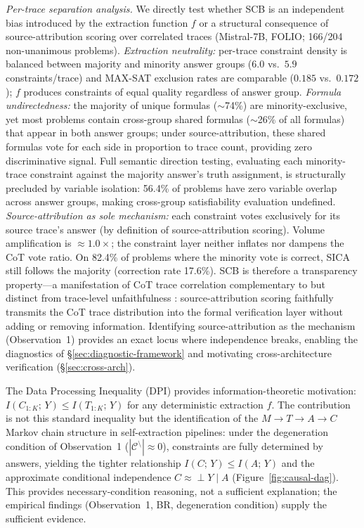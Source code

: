 \smallskip\noindent
\textit{Per-trace separation analysis.}\;%
 We directly test whether SCB is an independent bias introduced by the extraction function $f$ or a structural consequence of source-attribution scoring over correlated traces (Mistral-7B, FOLIO; 166/204 non-unanimous problems).
\emph{Extraction neutrality:} per-trace constraint density is balanced between majority and minority answer groups ($6.0$ vs.\ $5.9$ constraints/trace) and MAX-SAT exclusion rates are comparable ($0.185$ vs.\ $0.172$); $f$ produces constraints of equal quality regardless of answer group.
\emph{Formula undirectedness:} the majority of unique formulas (${\sim}$74\%) are minority-exclusive, yet most problems contain cross-group shared formulas (${\sim}$26\% of all formulas) that appear in both answer groups; under source-attribution, these shared formulas vote for each side in proportion to trace count, providing zero discriminative signal. Full semantic direction testing, evaluating each minority-trace constraint against the majority answer's truth assignment, is structurally precluded by variable isolation: 56.4\% of problems have zero variable overlap across answer groups, making cross-group satisfiability evaluation undefined.
\emph{Source-attribution as sole mechanism:} each constraint votes exclusively for its source trace's answer (by definition of source-attribution scoring). Volume amplification is ${\approx}1.0\times$; the constraint layer neither inflates nor dampens the CoT vote ratio. On 82.4\% of problems where the minority vote is correct, SICA still follows the majority (correction rate 17.6\%).
SCB is therefore a transparency property---a manifestation of CoT trace correlation \citep{kim2025correlated} complementary to but distinct from trace-level unfaithfulness \citep{turpin2023language, wan2025unveiling}: source-attribution scoring faithfully transmits the CoT trace distribution into the formal verification layer without adding or removing information. Identifying source-attribution as the mechanism (Observation~1) provides an exact locus where independence breaks, enabling the diagnostics of \S\ref{sec:diagnostic-framework} and motivating cross-architecture verification (\S\ref{sec:cross-arch}).

 The Data Processing Inequality (DPI) \citep{cover2006elements} provides information-theoretic motivation: $I(C_{1:K};\, Y) \leq I(T_{1:K};\, Y)$ for any deterministic extraction $f$. The contribution is not this standard inequality but the identification of the $M{\to}T{\to}A{\to}C$ Markov chain structure in self-extraction pipelines: under the degeneration condition of Observation~1 ($|\mathcal{C}^{\setminus}| \approx 0$), constraints are fully determined by answers, yielding the tighter relationship $I(C;\, Y) \leq I(A;\, Y)$ and the approximate conditional independence $C \approx\!\!\perp Y \mid A$ (Figure~\ref{fig:causal-dag}). This provides necessary-condition reasoning, not a sufficient explanation; the empirical findings (Observation~1, BR, degeneration condition) supply the sufficient evidence.

